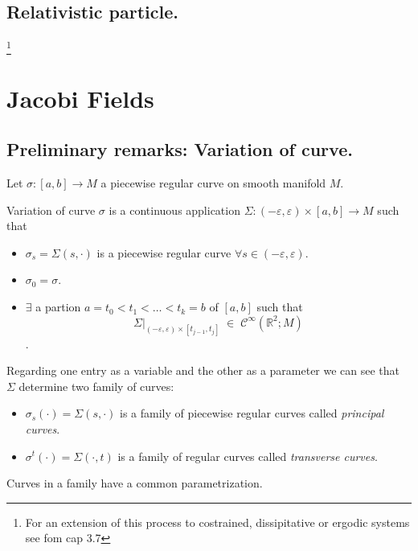 \documentclass[a4paper,12pt]{scrartcl}    %
\begin{document}
    
    
\subsection{Relativistic particle.}
	\footnote{For an extension of this process to costrained, dissipitative or ergodic systems see fom cap 3.7}


\newpage
\section{Jacobi Fields}

\subsection{Preliminary remarks: Variation of curve.}
Let $\sigma:[a,b]\rightarrow M$ a piecewise regular curve on smooth manifold $M$.

 \begin{definition}
  Variation of curve $\sigma$ is a continuous application $\Sigma: (-\varepsilon, \varepsilon) \times [a,b] \rightarrow M$ such that
  \begin{itemize}
   \item $\sigma_s = \Sigma(s, \cdot)$ is a piecewise regular curve $\forall s \in  (-\varepsilon, \varepsilon)$.
   \item $\sigma_0 = \sigma$.
   \item $\exists$ a partion $ a= t_0 < t_1 < \ldots < t_k=b$ of $[a,b]$ such that 
   $$ \Sigma \big \vert_{(-\varepsilon, \varepsilon) \times [t_{j-1},t_{j}]}\; \in \; \mathcal{C}^\infty(\mathbb{R}^2; M)$$.
  \end{itemize}
 \end{definition}
 
 \begin{notationfix}
  Regarding one entry as a variable and the other as a parameter we can see that $\Sigma$ determine two family of curves:
  \begin{itemize}
   \item $\sigma_s(\cdot)= \Sigma(s, \cdot)$ is a family of piecewise regular curves called \emph{principal curves}.
   \item $\sigma^t(\cdot)= \Sigma(\cdot , t)$ is a family of regular curves called \emph{transverse curves}.
  \end{itemize}
  Curves in a family have a common parametrization.
 \end{notationfix}
 
\end{document}
